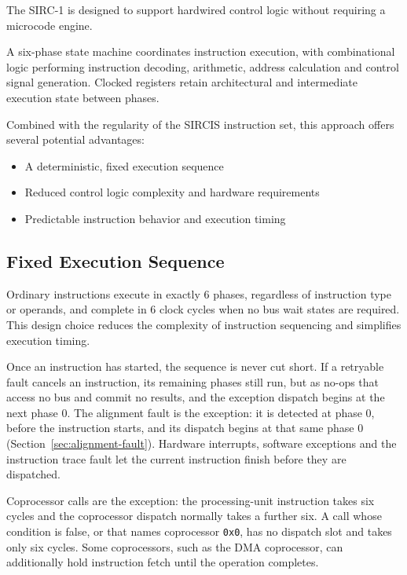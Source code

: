 The SIRC-1 is designed to support hardwired control logic without requiring a microcode engine.

A six-phase state machine coordinates instruction execution, with combinational logic performing instruction decoding,
arithmetic, address calculation and control signal generation. Clocked registers retain architectural and intermediate
execution state between phases.

Combined with the regularity of the SIRCIS instruction set, this approach offers several potential advantages:

\begin{itemize}
	\item A deterministic, fixed execution sequence
	\item Reduced control logic complexity and hardware requirements
	\item Predictable instruction behavior and execution timing
\end{itemize}

\subsection{Fixed Execution Sequence}

Ordinary instructions execute in exactly 6 phases, regardless of instruction type or operands, and complete in 6 clock
cycles when no bus wait states are required. This design choice reduces the complexity of instruction sequencing and
simplifies execution timing.

Once an instruction has started, the sequence is never cut short. If a retryable fault cancels an instruction, its
remaining phases still run, but as no-ops that access no bus and commit no results, and the exception dispatch begins
at the next phase 0. The alignment fault is the exception: it is detected at phase 0, before the instruction starts,
and its dispatch begins at that same phase 0 (Section~\ref{sec:alignment-fault}). Hardware interrupts, software
exceptions and the instruction trace fault let the current instruction finish before they are dispatched.

Coprocessor calls are the exception: the processing-unit instruction takes six cycles and the coprocessor dispatch
normally takes a further six. A call whose condition is false, or that names coprocessor \texttt{0x0}, has no dispatch
slot and takes only six cycles. Some coprocessors, such as the DMA coprocessor, can additionally hold instruction fetch
until the operation completes.

